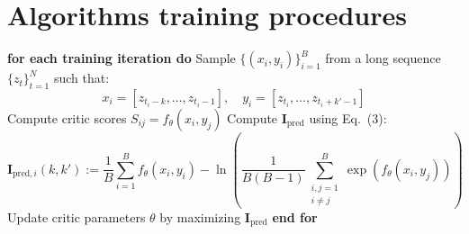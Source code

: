 \documentclass{article}
\begin{document}
\section{Algorithms training procedures}
\label{alg:evopred}
\begin{algorithm}[H]
\caption{$\mathbf{I}_{\text{pred}}$: Data is sampled in a sequential manner with temporal alignment}
\begin{algorithmic}[1]
\State \textbf{for each training iteration do}
\State \quad Sample $\{(x_i, y_i)\}_{i=1}^B$ from a long sequence $\{z_t\}_{t=1}^N$ such that:
\[
x_i = [z_{t_i - k}, \ldots, z_{t_i - 1}], \quad y_i = [z_{t_i}, \ldots, z_{t_i + k' - 1}]
\]
\State \quad Compute critic scores $S_{ij} = f_\theta(x_i, y_j)$
\State \quad Compute $\mathbf{I}_{\text{pred}}$ using Eq.~(3):
\[
\mathbf{I}_{\text{pred}, i}(k, k')
 := \frac{1}{B} \sum_{i=1}^B f_\theta(x_i, y_i)
- \ln \left( \frac{1}{B(B-1)} \sum_{\substack{i,j=1 \\ i \ne j}}^B \exp(f_\theta(x_i, y_j)) \right)
\]
\State \quad Update critic parameters $\theta$ by maximizing $\mathbf{I}_{\text{pred}}$
\State \textbf{end for}
\end{algorithmic}
\end{algorithm}

  
\end{document}
